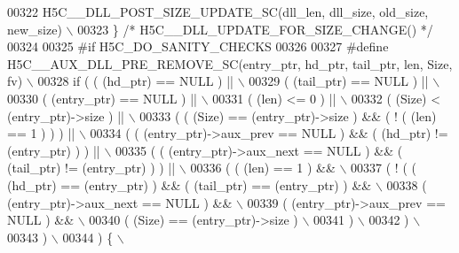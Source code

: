 \begin{DoxyCode}
00322 \textcolor{preprocessor}{    H5C\_\_DLL\_POST\_SIZE\_UPDATE\_SC(dll\_len, dll\_size, old\_size, new\_size)        \(\backslash\)}
00323 \textcolor{preprocessor}{\} }\textcolor{comment}{/* H5C\_\_DLL\_UPDATE\_FOR\_SIZE\_CHANGE() */}\textcolor{preprocessor}{}
00324 
00325 \textcolor{preprocessor}{#if H5C\_DO\_SANITY\_CHECKS}
00326 
00327 \textcolor{preprocessor}{#define H5C\_\_AUX\_DLL\_PRE\_REMOVE\_SC(entry\_ptr, hd\_ptr, tail\_ptr, len, Size, fv) \(\backslash\)}
00328 \textcolor{preprocessor}{if ( ( (hd\_ptr) == NULL ) ||                                                   \(\backslash\)}
00329 \textcolor{preprocessor}{     ( (tail\_ptr) == NULL ) ||                                                 \(\backslash\)}
00330 \textcolor{preprocessor}{     ( (entry\_ptr) == NULL ) ||                                                \(\backslash\)}
00331 \textcolor{preprocessor}{     ( (len) <= 0 ) ||                                                         \(\backslash\)}
00332 \textcolor{preprocessor}{     ( (Size) < (entry\_ptr)->size ) ||                                         \(\backslash\)}
00333 \textcolor{preprocessor}{     ( ( (Size) == (entry\_ptr)->size ) && ( ! ( (len) == 1 ) ) ) ||            \(\backslash\)}
00334 \textcolor{preprocessor}{     ( ( (entry\_ptr)->aux\_prev == NULL ) && ( (hd\_ptr) != (entry\_ptr) ) ) ||   \(\backslash\)}
00335 \textcolor{preprocessor}{     ( ( (entry\_ptr)->aux\_next == NULL ) && ( (tail\_ptr) != (entry\_ptr) ) ) || \(\backslash\)}
00336 \textcolor{preprocessor}{     ( ( (len) == 1 ) &&                                                       \(\backslash\)}
00337 \textcolor{preprocessor}{       ( ! ( ( (hd\_ptr) == (entry\_ptr) ) && ( (tail\_ptr) == (entry\_ptr) ) &&   \(\backslash\)}
00338 \textcolor{preprocessor}{             ( (entry\_ptr)->aux\_next == NULL ) &&                              \(\backslash\)}
00339 \textcolor{preprocessor}{             ( (entry\_ptr)->aux\_prev == NULL ) &&                              \(\backslash\)}
00340 \textcolor{preprocessor}{             ( (Size) == (entry\_ptr)->size )                                   \(\backslash\)}
00341 \textcolor{preprocessor}{           )                                                                   \(\backslash\)}
00342 \textcolor{preprocessor}{       )                                                                       \(\backslash\)}
00343 \textcolor{preprocessor}{     )                                                                         \(\backslash\)}
00344 \textcolor{preprocessor}{   ) \{                                                                         \(\backslash\)}

\end{DoxyCode}
